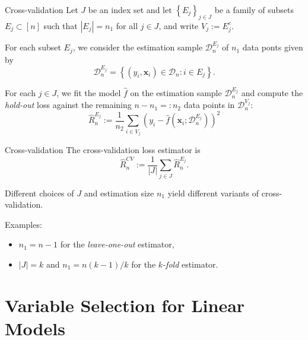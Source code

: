 \documentclass{beamer}
\newcommand{\0}{\emptyset}
\newcommand{\paren}[1]{\left(#1 \right)}
\newcommand{\set}[1]{\left\{ #1 \right\}}
\newcommand{\data}{\mathcal{D}_{n}}
\newcommand{\x}{\boldsymbol{x}}
\newcommand{\1}{\mathmybb{1}}
\begin{document}
\begin{frame}{Cross-validation}  
    Let \(J\) be an index set and let \(\set{E_{j}}_{j\in J}\) be a family of subsets \(E_{j}\subset [n]\) such that \(|E_{j}|=n_{1}\) for all \(j\in J\), and write \(V_{j} := E_{j}^{c}\). 
  
    For each subset \(E_{j}\), we consider the estimation sample \(\data^{E_{j}}\) of \(n_{1}\) data ponts given by
    \[\data^{E_{j}} = \set{\paren{y_{i}, \x_{i}}\in\data :i\in E_{j}}.\]

    For each \(j\in J\), we fit the model \(\hat{f}\) on the estimation sample \(\data^{E_{j}}\) and compute the \alert{\emph{hold-out}} loss against the remaining \(n-n_{1}=: n_{2}\) data points in \(\data^{V_{j}}\):
    \[\hat{R}_{n}^{E_{j}} := \frac{1}{n_{2}}\sum_{i \in V_{j}} \paren{y_{i} - \hat{f}\paren{\x_{i};\data^{E_{j}}}}^{2}\]
\end{frame}

\begin{frame}{Cross-validation}
    The cross-validation loss estimator is
    \[\hat{R}^{CV}_{n}:= \frac{1}{|J|}\sum_{j\in J}\hat{R}_{n}^{E_{j}}.\]

    Different choices of  \(J\) and estimation size \(n_{1}\) yield different variants of cross-validation.
  
    Examples:
    \begin{itemize}
        \item \(n_{1}=n-1\) for the \emph{leave-one-out} estimator,
        \item \(|J|=k\) and \(n_{1} = n(k-1)/k\) for the \emph{\(k\)-fold} estimator.
    \end{itemize}

\end{frame}

\section{Variable Selection for Linear Models}\label{sec:lm}
\end{document}
